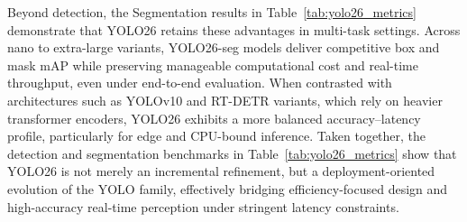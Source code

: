 \documentclass{article}
\begin{document}
Beyond detection, the Segmentation results in Table~\ref{tab:yolo26_metrics} demonstrate that YOLO26 retains these advantages in multi-task settings. Across nano to extra-large variants, YOLO26-seg models deliver competitive box and mask mAP while preserving manageable computational cost and real-time throughput, even under end-to-end evaluation. When contrasted with architectures such as YOLOv10 and RT-DETR variants, which rely on heavier transformer encoders, YOLO26 exhibits a more balanced accuracy–latency profile, particularly for edge and CPU-bound inference. Taken together, the detection and segmentation benchmarks in Table~\ref{tab:yolo26_metrics} show that YOLO26 is not merely an incremental refinement, but a deployment-oriented evolution of the YOLO family, effectively bridging efficiency-focused design and high-accuracy real-time perception under stringent latency constraints.
\end{document}
